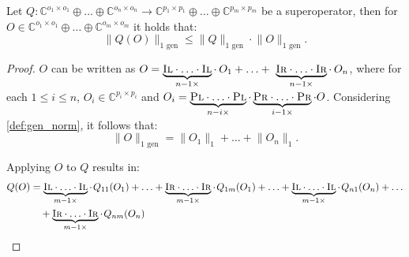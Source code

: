 \begin{lemma}\label{lem:q(o)}
  Let  $Q: \mathbb{C}^{o_1 \times o_1} \oplus \ldots \oplus \mathbb{C}^{o_n \times o_n}  \rightarrow \mathbb{C}^{p_1 \times p_1} \oplus \ldots \oplus  \mathbb{C}^{p_m \times p_m}$ be a superoperator, then for $O \in \mathbb{C}^{o_1 \times o_1} \oplus \ldots \oplus  \mathbb{C}^{o_m \times o_m}$ it holds that:
  \begin{equation} \label{eq:qo<q}
    \lVert Q(O) \rVert_{1 \text{ gen}} \leq \lVert Q  \rVert_{1 \text{ gen}} \cdot \lVert O  \rVert_{1 \text{ gen}}.
  \end{equation}
\end{lemma}

\begin{proof}
  $O$ can be written as  $O = \underbrace{\textsc{Il} \cdot \ldots \cdot \textsc{Il}}_{n-1 \times} \cdot \hspace{2pt} O_{1} + \ldots +  \underbrace{\textsc{Ir} \cdot \ldots \cdot \textsc{Ir}}_{n-1 \times} \cdot \hspace{2pt} O_{n} 
$, where for each $1 \leq i \leq n$, $O_{i} \in \mathbb{C}^{p_i \times p_i}$ and $O_i =  \underbrace{\textsc{Pl} \cdot \ldots \cdot \textsc{Pl}}_{n-i \times} \cdot \underbrace{\textsc{Pr} \cdot \ldots \cdot \textsc{Pr}}_{i-1 \times} \cdot O $. Considering \autoref{def:gen_norm}, it follows that: 
\begin{equation}
  \lVert O  \rVert_{1 \text{ gen}} = \lVert O_1 \rVert_{1} + \ldots + \lVert O_n \rVert_{1}.
\end{equation}

Applying $O$ to $Q$ results in:
\begin{equation}
\begin{split}
Q(O) & = \underbrace{\textsc{Il} \cdot \ldots \cdot \textsc{Il}}_{m-1 \times} \cdot \hspace{1pt} Q_{11}  (O_{1}) + \ldots +   \underbrace{\textsc{Ir} \cdot \ldots \cdot \textsc{Ir}}_{m-1 \times}\cdot \hspace{1pt} Q_{1m} (O_{1}) + \ldots +  \underbrace{\textsc{Il} \cdot \ldots \cdot \textsc{Il}}_{m-1 \times} \cdot\hspace{1pt} Q_{n1} (O_{n}) +  \ldots \\
& \hspace{10pt}  + \underbrace{\textsc{Ir} \cdot \ldots \cdot \textsc{Ir}}_{m-1 \times}\cdot \hspace{1pt} Q_{nm}  (O_{n})
\end{split}
\end{equation}


\end{proof}
